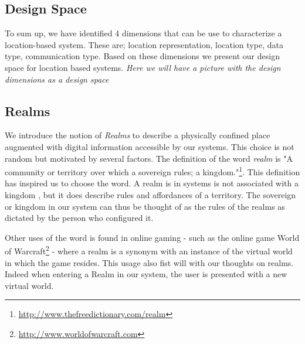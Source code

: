 

\subsection{Design Space} %
\label{sub:design_space}
To sum up, we have identified 4 dimensions that can be use to characterize a location-based system. These are; location representation, location type, data type, communication type. Based on these dimensions we present our design space for location based systems.  \emph{Here we will have a picture with the design dimensions as a design space}


\subsection{Realms} %
\label{sub:realms}
We introduce the notion of \emph{Realms} to describe a physically confined place augmented with digital information accessible by our systems. This choice is not random but motivated by several factors. The definition of the word \emph{realm} is "A community or territory over which a sovereign rules; a kingdom."\footnote{\url{http://www.thefreedictionary.com/realm}}. This definition has inspired us to choose the word. A realm is in systems is not associated with a kingdom , but it does describe rules and affordances of a territory. The sovereign or kingdom in our system can thus be thought of as the rules of the realms as dictated by the person who configured it. 

Other uses of the word is found in online gaming - such as the online game World of Warcraft\footnote{\url{http://www.worldofwarcraft.com}} - where a realm is a synonym with an instance of the virtual world in which the game resides. This usage also fist will with our thoughts on realms. Indeed when entering a Realm in our system, the user is presented with a new virtual world.


